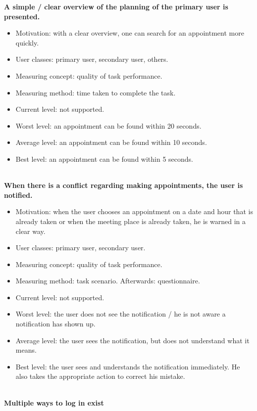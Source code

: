 \documentclass[11pt, a4paper,svglistings]{report}
\begin{document}
\textbf{A simple / clear overview of the planning of the primary user is presented.}
\begin{itemize}
\item{Motivation: with a clear overview, one can search for an appointment more quickly.}
\item{User classes: primary user, secondary user, others.}
\item{Measuring concept: quality of task performance.}
\item{Measuring method: time taken to complete the task.}
\item{Current level: not supported.}
\item{Worst level: an appointment can be found within 20 seconds.}
\item{Average level: an appointment can be found within 10 seconds.}
\item{Best level: an appointment can be found within 5 seconds. \\ \\}
\end{itemize}
\textbf{When there is a conflict regarding making appointments, the user is notified.}
\begin{itemize}
\item{Motivation: when the user chooses an appointment on a date and hour that is already taken or when the meeting place is already taken, he is warned in a clear way.}
\item{User classes: primary user, secondary user.}
\item{Measuring concept: quality of task performance.}
\item{Measuring method: task scenario. Afterwards: questionnaire.}
\item{Current level: not supported.}
\item{Worst level: the user does not see the notification / he is not aware a notification has shown up.}
\item{Average level: the user sees the notification, but does not understand what it means.}
\item{Best level: the user sees and understands the notification immediately. He also takes the appropriate action to correct his mistake. \\ \\}
\end{itemize}
\textbf{Multiple ways to log in exist}
\end{document}
